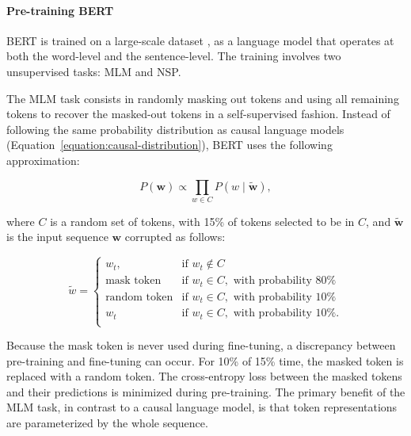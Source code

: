 \paragraph{Pre-training BERT}

\ac{BERT} is trained on a large-scale dataset \citep{zhu2015aligning}, as a language model that operates at both the word-level and the sentence-level. The training involves two unsupervised tasks: \ac{MLM} and \ac{NSP}. 

The \ac{MLM} task consists in randomly masking out tokens and using all remaining tokens to recover the masked-out tokens in a self-supervised fashion. Instead of following the same probability distribution as causal language models (Equation~\ref{equation:causal-distribution}), \ac{BERT} uses the following approximation:

\begin{equation}
    P(\bm{w}) \propto \prod_{w \in C}P\left(w \mid \tilde{\bm{w}}\right),
\end{equation}

\noindent where $C$ is a random set of tokens, with 15\% of tokens selected to be in $C$, and $\tilde{\bm{w}}$ is the input sequence $\bm{w}$ corrupted as follows:

\begin{equation}
    \tilde{w} = 
\begin{cases}
    w_t,               & \text{if } w_t \notin C\\
    \text{mask token}       & \text{if } w_t \in C, \text{ with probability 80\%} \\
    \text{random token}       & \text{if } w_t \in C, \text{ with probability 10\%} \\
    w_t       & \text{if } w_t \in C, \text{ with probability 10\%.} \\
\end{cases}
\end{equation}

\noindent Because the mask token is never used during fine-tuning, a discrepancy between pre-training and fine-tuning can occur. For 10\% of 15\% time, the masked token is replaced with a random token. The cross-entropy loss between the masked tokens and their predictions is minimized during pre-training. The primary benefit of the \ac{MLM} task, in contrast to a causal language model, is that token representations are parameterized by the whole sequence.

